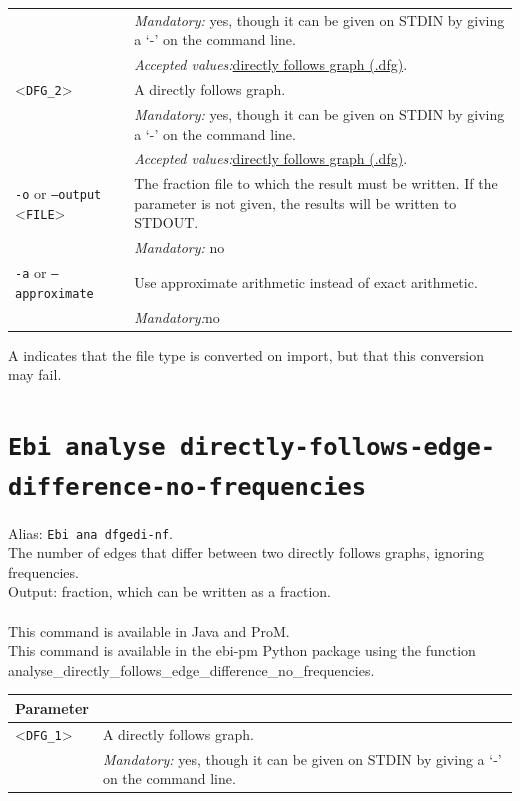 {\begin{tabularx}{\linewidth}{lX}
&\textit{Mandatory:} \quad yes, though it can be given on STDIN by giving a `-' on the command line.\\
&\textit{Accepted values:}\quad \hyperref[filehandler:directly follows graph]{directly follows graph (.dfg)}.\\
<\texttt{DFG\_2}>&A directly follows graph.\\
&\textit{Mandatory:} \quad yes, though it can be given on STDIN by giving a `-' on the command line.\\
&\textit{Accepted values:}\quad \hyperref[filehandler:directly follows graph]{directly follows graph (.dfg)}.\\
\texttt{-o} or \texttt{--output} <\texttt{FILE}> &
The fraction file to which the result must be written. If the parameter is not given, the results will be written to STDOUT.\\
&\textit{Mandatory:} \quad no\\
\texttt{-a} or \texttt{--approximate} & Use approximate arithmetic instead of exact arithmetic.\\
&\textit{Mandatory:}\quad no\\
\bottomrule
\end{tabularx}
A \textdagger{} indicates that the file type is converted on import, but that this conversion may fail.
\clearpage\section{\texttt{Ebi analyse directly-follows-edge-difference-no-frequencies}}
\label{command:Ebi analyse directly-follows-edge-difference-no-frequencies}
Alias: \texttt{Ebi ana dfgedi-nf}.\\
The number of edges that differ between two directly follows graphs, ignoring frequencies.\\
\noindent Output: fraction, which can be written as a fraction.\\
\\This command is available in Java and ProM.
\\This command is available in the ebi-pm Python package using the function analyse\_directly\_follows\_edge\_difference\_no\_frequencies.
\begin{tabularx}{\linewidth}{lX}
\toprule
Parameter \\\midrule
<\texttt{DFG\_1}>&A directly follows graph.\\
&\textit{Mandatory:} \quad yes, though it can be given on STDIN by giving a `-' on the command line.\\

\end{tabularx}}
